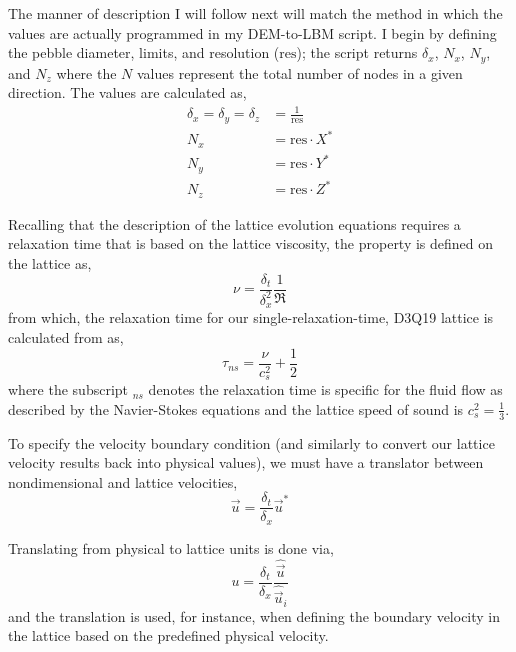 The manner of description I will follow next will match the method in which the values are actually programmed in my DEM-to-LBM script. I begin by defining the pebble diameter, limits, and resolution ($\text{res}$); the script returns $\delta_x$, $N_x$, $N_y$, and $N_z$ where the $N$ values represent the total number of nodes in a given direction. The values are calculated as,
\begin{subequations}
\begin{align}
	\delta_x = \delta_y = \delta_z & = \frac{1}{\text{res}} \\
	N_x & = \text{res}\cdot X^* \\
	N_y & = \text{res}\cdot Y^* \\
	N_z & = \text{res}\cdot Z^*
\end{align}
\end{subequations}

Recalling that the description of the lattice evolution equations requires a relaxation time that is based on the lattice viscosity, the property is defined on the lattice as,
\begin{equation}
	\nu = \frac{\delta_t}{\delta_x^2}\frac{1}{\Re}
\end{equation}
from which, the relaxation time for our single-relaxation-time, D3Q19 lattice is calculated from  as,
\begin{equation}
	\tau_{ns} = \frac{\nu}{c_s^2} + \frac{1}{2}
\end{equation}
where the subscript $_{ns}$ denotes the relaxation time is specific for the fluid flow as described by the Navier-Stokes equations and the lattice speed of sound is $c_s^2 = \frac{1}{3}$.

To specify the velocity boundary condition (and similarly to convert our lattice velocity results back into physical values), we must have a translator between nondimensional and lattice velocities,
\begin{equation}\label{eq:lbm-u}
	\vec{u} = \frac{\delta_t}{\delta_x}\vec{u}^*
\end{equation}

Translating from physical to lattice units is done via,
\begin{equation}
	u = \frac{\delta_t}{\delta_x}\frac{\hat{\vec{u}}}{\hat{\vec{u}}_i}
\end{equation}
and the translation is used, for instance, when defining the boundary velocity in the lattice based on the predefined physical velocity.

